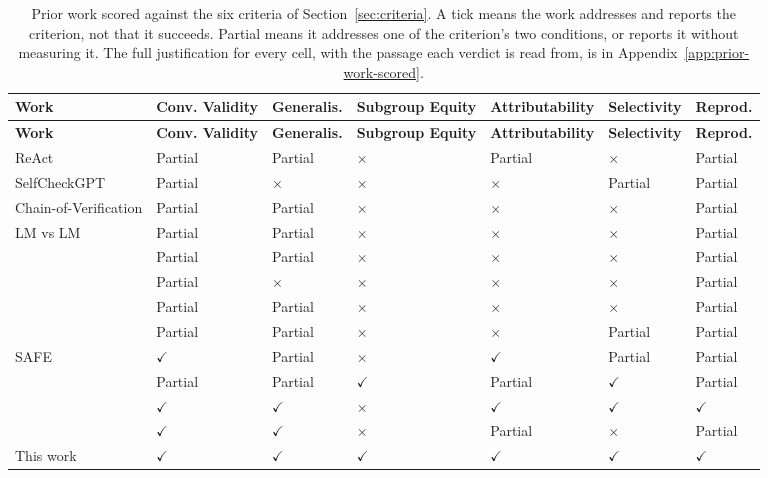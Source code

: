 {\footnotesize
\begin{longtable}[]{@{}
  L{0.1639}
  L{0.1382}
  L{0.1394}
  L{0.1393}
  L{0.1415}
  L{0.1395}
  L{0.1382}@{}}
\caption{Prior work scored against the six criteria of Section~\ref{sec:criteria}. A tick means the work addresses and reports the criterion, not that it succeeds. Partial means it addresses one of the criterion's two conditions, or reports it without measuring it. The full justification for every cell, with the passage each verdict is read from, is in Appendix~\ref{app:prior-work-scored}.}\label{tab:prior-work}\\
\toprule\noalign{}
\textbf{Work} & \textbf{Conv. Validity} & \textbf{Generalis.} & \textbf{Subgroup Equity} & \textbf{Attribut\-ability} & \textbf{Selectivity} & \textbf{Reprod.} \\
\midrule\noalign{}
\endfirsthead
\toprule\noalign{}
\textbf{Work} & \textbf{Conv. Validity} & \textbf{Generalis.} & \textbf{Subgroup Equity} & \textbf{Attribut\-ability} & \textbf{Selectivity} & \textbf{Reprod.} \\
\midrule\noalign{}
\endhead
\bottomrule\noalign{}
\endlastfoot
ReAct \citep{yao2023} & Partial & Partial & $\times$ & Partial & $\times$ & Partial \\
SelfCheck\-GPT \citep{manakul2023} & Partial & $\times$ & $\times$ & $\times$ & Partial & Partial \\
Chain-of-Verification \citep{dhuliawala2024} & Partial & Partial & $\times$ & $\times$ & $\times$ & Partial \\
LM vs LM \citep{cohen2023} & Partial & Partial & $\times$ & $\times$ & $\times$ & Partial \\
\citet{du2023} & Partial & Partial & $\times$ & $\times$ & $\times$ & Partial \\
\citet{liang2023} & Partial & $\times$ & $\times$ & $\times$ & $\times$ & Partial \\
\citet{smit2024} & Partial & Partial & $\times$ & $\times$ & $\times$ & Partial \\
\citet{zhu2026} & Partial & Partial & $\times$ & $\times$ & Partial & Partial \\
SAFE \citep{wei2024} & $\checkmark$ & Partial & $\times$ & $\checkmark$ & Partial & Partial \\
\citet{feng2024} & Partial & Partial & $\checkmark$ & Partial & $\checkmark$ & Partial \\
\citet{chowdhury2026} & $\checkmark$ & $\checkmark$ & $\times$ & $\checkmark$ & $\checkmark$ & $\checkmark$ \\
\citet{fumega2026} & $\checkmark$ & $\checkmark$ & $\times$ & Partial & $\times$ & Partial \\
This work & $\checkmark$ & $\checkmark$ & $\checkmark$ & $\checkmark$ & $\checkmark$ & $\checkmark$ \\
\end{longtable}
}


